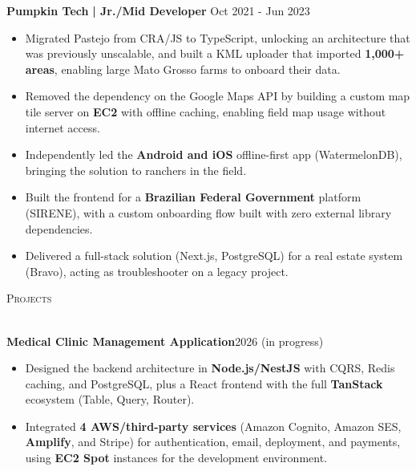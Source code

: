 \documentclass[a4paper]{article}
\newcommand{\lineunder}{
    \vspace*{-8pt} \\
    \hspace*{-18pt} \hrulefill \\
}
\newcommand{\header}[1]{
    {\hspace*{-18pt}\vspace*{6pt} \textsc{#1}}
    \vspace*{-6pt} \lineunder
}
\begin{document}
    \textbf{Pumpkin Tech}\textbf{ | Jr./Mid Developer} \hfill  Oct 2021 - Jun 2023\\
    \vspace{-3mm}
    \begin{itemize} \itemsep -3pt
        \item Migrated Pastejo from CRA/JS to TypeScript, unlocking an architecture that was previously unscalable, and built a KML uploader that imported \textbf{1,000+ areas}, enabling large Mato Grosso farms to onboard their data.
        \item Removed the dependency on the Google Maps API by building a custom map tile server on \textbf{EC2} with offline caching, enabling field map usage without internet access.
        \item Independently led the \textbf{Android and iOS} offline-first app (WatermelonDB), bringing the solution to ranchers in the field.
        \item Built the frontend for a \textbf{Brazilian Federal Government} platform (SIRENE), with a custom onboarding flow built with zero external library dependencies.
        \item Delivered a full-stack solution (Next.js, PostgreSQL) for a real estate system (Bravo), acting as troubleshooter on a legacy project.
    \end{itemize}

    \header{Projects}
    \vspace{2mm}

    \textbf{Medical Clinic Management Application}\hfill  2026 (in progress)\\
    \vspace{-3mm}
    \begin{itemize} \itemsep -3pt
        \item Designed the backend architecture in \textbf{Node.js/NestJS} with CQRS, Redis caching, and PostgreSQL, plus a React frontend with the full \textbf{TanStack} ecosystem (Table, Query, Router).
        \item Integrated \textbf{4 AWS/third-party services} (Amazon Cognito, Amazon SES, \textbf{Amplify}, and Stripe) for authentication, email, deployment, and payments, using \textbf{EC2 Spot} instances for the development environment.
    \end{itemize}
\end{document}
